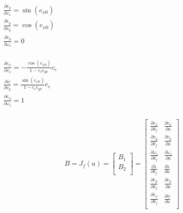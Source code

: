 \documentclass[12pt]{article}
\begin{document}
        $\begin{aligned}
            & \frac{\partial \dot{e_y}}{\partial v_x} = \sin(e_{\psi 0}) \\ 
            & \frac{\partial \dot{e_y}}{\partial v_y} = \cos(e_{\psi 0}) \\ 
            & \frac{\partial \dot{e_y}}{\partial \omega_z} = 0 \\
        \end{aligned}$

        $\begin{aligned}
            & \frac{\partial \dot{e_{\psi}}}{\partial v_x} = - \frac{\cos(e_{\psi 0})}{1 - c_c e_{y0}} c_c \\
            & \frac{\partial \dot{\psi}}{\partial v_y} = \frac{\sin(e_{\psi 0})}{1 - c_c e_{y0}} c_c \\
            & \frac{\partial \dot{e_{\psi}}}{\partial \omega_z} = 1 \\
        \end{aligned}$



        \begin{equation}
            \begin{aligned}
                & B = J_f(u)
                = 
                \begin{bmatrix} 
                    B_{1} \\
                    B_{2} \\
                \end{bmatrix}
                =
                \begin{bmatrix} 
                    \frac{\partial \dot{v}_x}{\partial \delta_f} & \frac{\partial \dot{v}_x}{\partial a}   \\
                    \frac{\partial \dot{v}_y}{\partial \delta_f} & \frac{\partial \dot{v}_y}{\partial a}   \\
                    \frac{\partial \dot{\omega}_z}{\partial \delta_f} & \frac{\partial \dot{\omega}_z}{\partial a}   \\
                    \frac{\partial \dot{s}}{\partial \delta_f} & \frac{\partial \dot{s}}{\partial a}   \\
                    \frac{\partial \dot{e_y}}{\partial \delta_f} & \frac{\partial \dot{e_y}}{\partial a}   \\
                    \frac{\partial \dot{e_{\psi}}}{\partial \delta_f} & \frac{\partial \dot{\psi}}{\partial a}   \\
                \end{bmatrix}  \\
            \end{aligned}
        \end{equation}
\end{document}
